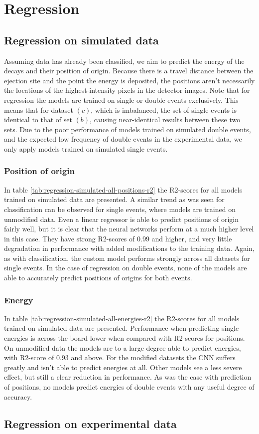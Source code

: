 \section{Regression}
\subsection{Regression on simulated data}
Assuming data has already been classified, we aim to predict the energy of the decays and their
position of origin. Because there is a travel distance between the 
ejection site and the point the energy is deposited, the positions aren't necessarily
the locations of the highest-intensity pixels in the detector images.
Note that for regression the models are trained on single or double events exclusively.
This means that for dataset $(c)$, which is imbalanced, the set of single events is
identical to that of set $(b)$, causing near-identical results between these two sets.
Due to the poor performance of models trained on simulated double events, and the
expected low frequency of double events in the experimental data, we only apply models
trained on simulated single events.
\subsubsection{Position of origin}
In table \ref{tab:regression-simulated-all-positions-r2} the R2-scores for all models
trained on simulated data are presented. A similar trend as was seen for classification
can be observed for single events, where models are trained on unmodified data. Even
a linear regressor is able to predict positions of origin fairly well, but it is clear
that the neural networks perform at a much higher level in this case. They have strong
R2-scores of 0.99 and higher, and very little degradation in performance with added 
modifications to the training data. Again, as with classification, the custom model
performs strongly across all datasets for single events.
In the case of regression on double events, none of the models are able to accurately
predict positions of origins for both events.

\subsubsection{Energy}
In table \ref{tab:regression-simulated-all-energies-r2} the R2-scores for all models
trained on simulated data are presented.
Performance when predicting single energies is across the board lower when compared with
R2-scores for positions. On unmodified data the models are to a large degree able to
predict energies, with R2-score of 0.93 and above. For the modified datasets the CNN
suffers greatly and isn't able to predict energies at all. Other models see a less
severe effect, but still a clear reduction in performance.
As was the case with prediction of positions, no models predict energies
of double events with any useful degree of accuracy.


\subsection{Regression on experimental data}

